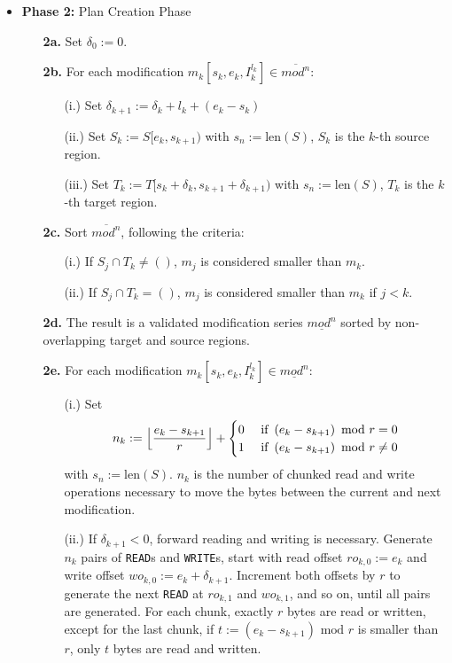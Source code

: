 \documentclass[english, 10pt, openright, twocolumn, landscape, twoside, notitlepage, a4paper, pdftex]		
{article}
\begin{document}
\begin{itemize}
\item \textbf{Phase 2:} Plan Creation Phase
\begin{enumerate}
\item [\textbf{2a.}] Set $\delta_{0}:=0$.
\item [\textbf{2b.}] For each modification $m_{k}[s_{k}, e_{k}, I_{k}^{l_{k}}]\in\overline{mod^{n}}$:
\begin{enumerate}
\item [(i.)] Set $\delta_{k+1}:=\delta_{k}+l_{k}+(e_{k}-s_{k})$
\item [(ii.)] Set $S_{k}:=S[e_{k},s_{k+1})$ with $s_{n}:=\text{len}(S)$, $S_{k}$ is the $k$-th source region.
\item [(iii.)] Set $T_{k}:=T[s_{k}+\delta_{k},s_{k+1}+\delta_{k+1})$ with $s_{n}:=\text{len}(S)$, $T_{k}$ is the $k$-th target region.
\end{enumerate}
\item [\textbf{2c.}] Sort $\overline{mod^{n}}$, following the criteria:
\begin{enumerate}
\item[(i.)] If $S_{j}\cap T_{k}\neq ()$, $m_{j}$ is considered smaller than $m_{k}$.
\item[(ii.)] If $S_{j}\cap T_{k}=()$, $m_{j}$ is considered smaller than $m_{k}$ if $j<k$.
\end{enumerate}
\item [\textbf{2d.}] The result is a validated modification series $\underline{mod^{n}}$ sorted by non-overlapping target and source regions.
\item [\textbf{2e.}] For each modification $m_{k}[s_{k}, e_{k}, I_{k}^{l_{k}}]\in\underline{mod^{n}}$:
\begin{enumerate}
\item [(i.)] Set 
\[n_{k}:=\Bigl\lfloor\frac{e_{k}-s_{k+1}}{r}\Bigr\rfloor+
\begin{cases}
0 & \text{ if }\left(e_{k}-s_{k+1}\right)\text{ mod } r = 0\\
1 & \text{ if }\left(e_{k}-s_{k+1}\right)\text{ mod } r \neq 0\\
\end{cases}\]
 with $s_{n}:=\text{len}(S)$. $n_{k}$ is the number of chunked read and write operations necessary to move the bytes between the current and next modification.
\item [(ii.)] If $\delta_{k+1}<0$, forward reading and writing is necessary. Generate $n_{k}$ pairs of \texttt{READ}s and \texttt{WRITE}s, start with read offset $ro_{k,0}:=e_{k}$ and write offset $wo_{k,0}:=e_{k}+\delta_{k+1}$. Increment both offsets by $r$ to generate the next \texttt{READ} at $ro_{k,1}$ and $wo_{k,1}$, and so on, until all pairs are generated. For each chunk, exactly $r$ bytes are read or written, except for the last chunk, if $t:=\left(e_{k}-s_{k+1}\right)\text{ mod } r$ is smaller than $r$, only $t$ bytes are read and written.

\end{enumerate}
\end{enumerate}
\end{itemize}
\end{document}
